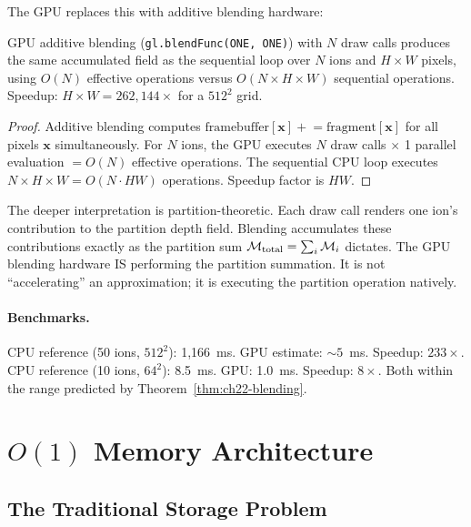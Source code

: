 The GPU replaces this with additive blending hardware:

\begin{theorem}
\label{thm:ch22-blending}
  GPU additive blending (\texttt{gl.blendFunc(ONE, ONE)}) with $N$ draw calls
  produces the same accumulated field as the sequential loop over $N$ ions
  and $H\times W$ pixels, using $O(N)$ effective operations versus
  $O(N\times H\times W)$ sequential operations.  Speedup: $H\times W =
  262{,}144\times$ for a $512^2$ grid.
\end{theorem}

\begin{proof}
  Additive blending computes $\mathrm{framebuffer}[\mathbf{x}]\mathrel{+}=
  \mathrm{fragment}[\mathbf{x}]$ for all pixels $\mathbf{x}$ simultaneously.
  For $N$ ions, the GPU executes $N$ draw calls $\times$ 1 parallel
  evaluation $= O(N)$ effective operations.  The sequential CPU loop
  executes $N\times H\times W = O(N\cdot HW)$ operations.  Speedup factor
  is $HW$.
\end{proof}

The deeper interpretation is partition-theoretic.  Each draw call renders one
ion's contribution to the partition depth field.  Blending accumulates these
contributions exactly as the partition sum
$\mathcal{M}_{\mathrm{total}} = \sum_i \mathcal{M}_i$
dictates.  The GPU blending hardware IS performing the partition summation.
It is not ``accelerating'' an approximation; it is executing the partition
operation natively.

\paragraph{Benchmarks.}
CPU reference (50 ions, $512^2$): 1{,}166~ms.  GPU estimate: ${\sim}5$~ms.
Speedup: $233\times$.  CPU reference (10 ions, $64^2$): 8.5~ms.  GPU: 1.0~ms.
Speedup: $8\times$.  Both within the range predicted by Theorem~\ref{thm:ch22-blending}.

\section{$O(1)$ Memory Architecture}
\label{sec:ch22-memory}

\subsection{The Traditional Storage Problem}

